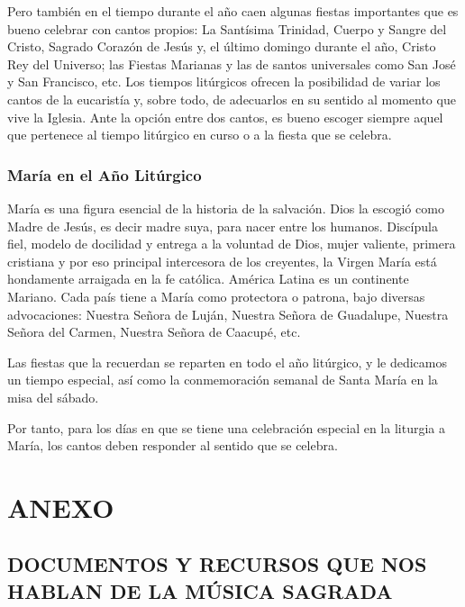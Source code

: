 \documentclass[letterpaper, 12pt]{book}
\begin{document}
    Pero tambi\'en en el tiempo durante el a\~no caen algunas fiestas importantes que es bueno celebrar con cantos propios: La Sant\'isima Trinidad, Cuerpo y Sangre del Cristo, Sagrado Coraz\'on de Jes\'us y, el \'ultimo domingo durante el a\~no, Cristo Rey del Universo; las Fiestas Marianas y las de santos universales como San Jos\'e y San Francisco, etc. Los tiempos lit\'urgicos ofrecen la posibilidad de variar los cantos de la eucarist\'ia y, sobre todo, de adecuarlos en su sentido al momento que vive la Iglesia. Ante la opci\'on entre dos cantos, es bueno escoger siempre aquel que pertenece al tiempo lit\'urgico en curso o a la fiesta que se celebra.
    
    \section{Mar\'ia en el A\~no Lit\'urgico}
    Mar\'ia es una figura esencial de la historia de la salvaci\'on. Dios la escogi\'o como Madre de Jes\'us, es decir madre suya, para nacer entre los humanos. Disc\'ipula fiel, modelo de docilidad y entrega a la voluntad de Dios, mujer valiente, primera cristiana y por eso principal intercesora de los creyentes, la Virgen Mar\'ia est\'a hondamente arraigada en la fe cat\'olica. Am\'erica Latina es un continente Mariano. Cada pa\'is tiene a Mar\'ia como protectora o patrona, bajo diversas advocaciones: Nuestra Se\~nora de Luj\'an, Nuestra Se\~nora de Guadalupe, Nuestra Se\~nora del Carmen, Nuestra Se\~nora de Caacup\'e, etc.\newline
    
    Las fiestas que la recuerdan se reparten en todo el a\~no lit\'urgico, y le dedicamos un tiempo especial, as\'i como la conmemoraci\'on semanal de Santa Mar\'ia en la misa del s\'abado.\newline
    
    Por tanto, para los d\'ias en que se tiene una celebraci\'on especial en la liturgia a Mar\'ia, los cantos deben responder al sentido que se celebra.
    
    \part{ANEXO}
    
    \chapter{DOCUMENTOS Y RECURSOS QUE NOS HABLAN DE LA M\'USICA SAGRADA}
    
\end{document}
